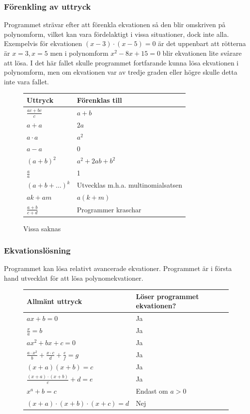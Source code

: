 \documentclass[12pt,a4paper]{article}
\begin{document}
\subsubsection{Förenkling av uttryck}
Programmet strävar efter att förenkla ekvationen så den blir omskriven på polynomform, vilket kan vara fördelaktigt i vissa situationer, dock inte alla. Exempelvis för ekvationen \((x-3) \cdot (x-5)=0\) är det uppenbart att rötterna är \(x=3, x=5\) men i polynomform \(x^{2}-8x+15=0\) blir ekvationen lite svårare att lösa. I det här fallet skulle programmet fortfarande kunna lösa ekvationen i polynomform, men om ekvationen var av tredje graden eller högre skulle detta inte vara fallet.
\begin{savenotes}
\begin{figure}[H]
  \centering
  \begin{tabular}{l|l}
    \textbf{Uttryck} & \textbf{Förenklas till} \\
    \hline
    \(\frac{ac + bc}{c}\) & \(a+b\) \\
    \(a+a\) & \(2a\) \\
    \(a \cdot a\) & \(a^{2}\) \\
    \(a - a\) & \(0\) \\
    \((a+b)^{2}\) & \(a^{2} + 2ab + b^{2}\) \\
    \(\frac{a}{a}\) & 1 \\
    \((a+b+\ldots)^{k}\) & Utvecklas m.h.a. multinomialsatsen \\
    \(ak+am\) & \(a(k+m)\) \\
    \(\frac{a+b}{c+d}\) & Programmer kraschar
  \end{tabular}
  \label{tab:expressions}Vissa saknas
\end{figure}
\end{savenotes}

\subsubsection{Ekvationslösning}
Programmet kan lösa relativt avancerade ekvationer. Programmet är i första hand utvecklat för att lösa polynomekvationer.

\begin{figure}[h!]
  \centering
  \begin{tabular}{l|l}
    \textbf{Allmänt uttryck} & \textbf{Löser programmet ekvationen?} \\
    \hline
    \(ax+b=0\) & Ja \\
    \(\frac{x}{a}=b\) & Ja \\
    \(ax^2+bx+c=0\) & Ja \\
    \(\frac{a \cdot x^2}{b}+\frac{x \cdot c}{d}+\frac{e}{f}=g\) & Ja \\
    \((x+a)(x+b)=c\) & Ja \\
    \(\frac{(x+a)\cdot(x+b)}{c}+d=e\) & Ja \\
    \(x^a+b=c\) & Endast om \( a>0 \) \\
    \((x+a)\cdot(x+b)\cdot(x+c)=d\) & Nej 
  \end{tabular}
  \label{tab:lexer_patterns}
\end{figure}
\end{document}
